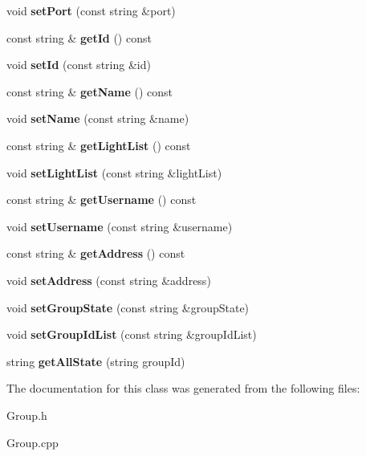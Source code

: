 \begin{DoxyCompactItemize}
\mbox{\label{class_group_a29c3300630cfbeb89f7a009bd79e9fb9}} 
void {\bfseries set\+Port} (const string \&port)
\item 
\mbox{\label{class_group_af91b2d26c80bacb79d6fb33e3fe122df}} 
const string \& {\bfseries get\+Id} () const
\item 
\mbox{\label{class_group_a808a6bdb7e099f6c094b34c060eb4fa5}} 
void {\bfseries set\+Id} (const string \&id)
\item 
\mbox{\label{class_group_aefcfc39a695835631fbb721b184c45bd}} 
const string \& {\bfseries get\+Name} () const
\item 
\mbox{\label{class_group_aa2869e9491a1977088ebbe5a4755dcff}} 
void {\bfseries set\+Name} (const string \&name)
\item 
\mbox{\label{class_group_ad4512e295ca4917dade40fc014f9956d}} 
const string \& {\bfseries get\+Light\+List} () const
\item 
\mbox{\label{class_group_aa4889c12bc13e9af2df8233709d523f5}} 
void {\bfseries set\+Light\+List} (const string \&light\+List)
\item 
\mbox{\label{class_group_a4531f0b1a6cfbe5a3f21e9b49fa9f9f9}} 
const string \& {\bfseries get\+Username} () const
\item 
\mbox{\label{class_group_a7e5eb3f7c92f6afae7a8df75aaa66a68}} 
void {\bfseries set\+Username} (const string \&username)
\item 
\mbox{\label{class_group_ad2f128f7df10f6a13c3dcd361833f145}} 
const string \& {\bfseries get\+Address} () const
\item 
\mbox{\label{class_group_ad98b1ef81a6397b52275b5fb7760497c}} 
void {\bfseries set\+Address} (const string \&address)
\item 
\mbox{\label{class_group_a039fcd687c3ecb5990b0aed632e78270}} 
void {\bfseries set\+Group\+State} (const string \&group\+State)
\item 
\mbox{\label{class_group_a8465ae4477e9ec7d26460ee1b5b81e38}} 
void {\bfseries set\+Group\+Id\+List} (const string \&group\+Id\+List)
\item 
\mbox{\label{class_group_a830acdb0bf78392b36385f3f46b9b03c}} 
string {\bfseries get\+All\+State} (string group\+Id)
\end{DoxyCompactItemize}


The documentation for this class was generated from the following files\+:\begin{DoxyCompactItemize}
\item 
Group.\+h\item 
Group.\+cpp\end{DoxyCompactItemize}
